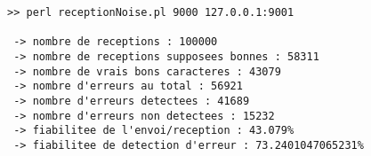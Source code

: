         \begin{lstlisting}
>> perl receptionNoise.pl 9000 127.0.0.1:9001

 -> nombre de receptions : 100000
 -> nombre de receptions supposees bonnes : 58311
 -> nombre de vrais bons caracteres : 43079
 -> nombre d'erreurs au total : 56921
 -> nombre d'erreurs detectees : 41689
 -> nombre d'erreurs non detectees : 15232
 -> fiabilitee de l'envoi/reception : 43.079%
 -> fiabilitee de detection d'erreur : 73.2401047065231%

        \end{lstlisting}
